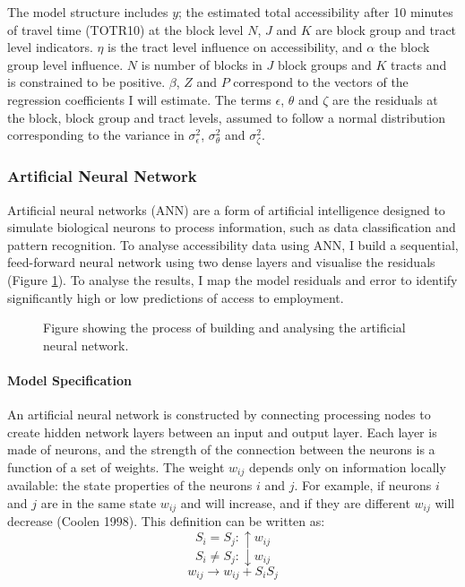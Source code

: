 \documentclass[a4paper,UKenglish]{lipics-v2018}
\begin{document}
The model structure includes $y$; the estimated total accessibility after 10 minutes of travel time (TOTR10) at the block level $N$, $J$ and $K$ are block group and tract level indicators. $\eta$ is the tract level influence on accessibility, and $\alpha$ the block group level influence. $N$ is number of blocks in $J$ block groups and $K$ tracts and is constrained to be positive. $\beta$, $Z$ and $P$ correspond to the vectors of the regression coefficients I will estimate. The terms $\epsilon$, $\theta$ and $\zeta$ are the residuals at the block, block group and tract levels, assumed to follow a normal distribution corresponding to the variance in $\sigma^2_\epsilon$, $\sigma^2_\theta$ and $\sigma^2_\zeta$.

\subsubsection{Artificial Neural Network}
Artificial neural networks (ANN) are a form of artificial intelligence designed to simulate biological neurons to process information, such as data classification and pattern recognition.  To analyse accessibility data using ANN, I build a sequential, feed-forward neural network using two dense layers and visualise the residuals (Figure \ref{fig:ANN_diagram}). To analyse the results, I map the model residuals and error to identify significantly high or low predictions of access to employment. 

\begin{figure}[ht]
    \centering
    \caption[Artificial Neural Network analysis process]{Figure showing the process of building and analysing the artificial neural network.} 
    \label{fig:ANN_diagram}
\end{figure}

\paragraph{Model Specification}
An artificial neural network is constructed by connecting processing nodes to create hidden network layers between an input and output layer. Each layer is made of neurons, and the strength of the connection between the neurons is a function of a set of weights. The weight $w_{ij}$ depends only on information locally available: the state properties of the neurons $i$ and $j$. For example, if neurons $i$ and $j$ are in the same state $w_{ij}$ and will increase, and if they are different $w_{ij}$ will decrease (Coolen 1998). This definition can be written as:
\[S_i = S_j: \uparrow w_{ij}\]
\[S_i \neq S_j: \downarrow w_{ij}\]
\[w_{ij} \rightarrow w_{ij} + S_i S_j\]
\end{document}
